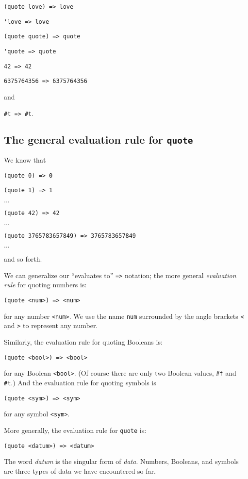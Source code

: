 \documentclass{book}
\begin{document}
\verb|(quote love) => love|

\verb|'love => love|

\verb|(quote quote) => quote|

\verb|'quote => quote|

\verb|42 => 42|

\verb|6375764356 => 6375764356|

\noindent
and

\verb|#t => #t|.

\subsection{The general evaluation rule for \texttt{quote}}

We know that 

\verb|(quote 0) => 0|

\verb|(quote 1) => 1|

$\ldots$

\verb|(quote 42) => 42|

$\ldots$

\verb|(quote 3765783657849) => 3765783657849|

$\ldots$

\noindent
and so forth.

We can generalize our ``evaluates to'' \verb|=>| notation; the more general \emph{evaluation rule} for quoting numbers is:

\verb|(quote <num>) => <num>|

\noindent
for any number \verb|<num>|.  We use the name \verb|num| surrounded by the angle brackets \verb|<| and \verb|>| to represent any number.

Similarly, the evaluation rule for quoting Booleans is:

\verb|(quote <bool>) => <bool>|

\noindent
for any Boolean \verb|<bool>|.  (Of course there are only two Boolean values, \verb|#f| and \verb|#t|.)  And the evaluation rule for quoting symbols is 

\verb|(quote <sym>) => <sym>|

\noindent
for any symbol \verb|<sym>|.

More generally, the evaluation rule for \verb|quote| is:

\verb|(quote <datum>) => <datum>|

\noindent
The word \emph{datum} is the singular form of \emph{data}.  Numbers, Booleans, and symbols are three types of data we have encountered so far.
\end{document}
